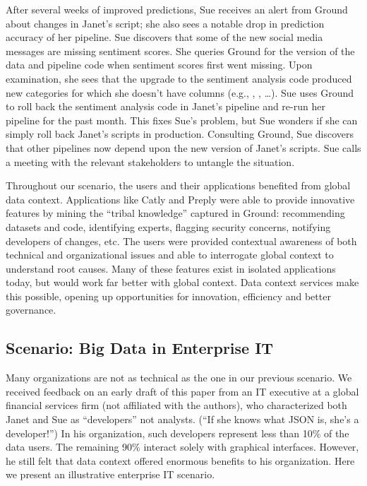 \documentclass{sig-alternate}
\begin{document}
After several weeks of improved predictions, Sue receives an alert from Ground about changes in Janet's script; she also sees a notable drop in prediction accuracy of her pipeline. 
Sue discovers that some of the new social media messages are missing sentiment scores.
She queries Ground for the version of the data and pipeline code when sentiment scores first went missing.
Upon examination, she sees that the upgrade to the sentiment analysis code produced new categories for which she doesn't have columns (e.g., , , \ldots).
Sue uses Ground to roll back the sentiment analysis code in Janet's pipeline and re-run her pipeline for the past month.  
This fixes Sue's problem, but Sue wonders if she can simply roll back Janet's scripts in production. 
Consulting Ground, Sue discovers that other pipelines now depend upon the new version of Janet's scripts.
Sue calls a meeting with the relevant stakeholders to untangle the situation.

Throughout our scenario, the users and their applications benefited from global data context. 
Applications like Catly and Preply were able to provide innovative features by mining the ``tribal knowledge'' captured in Ground:
recommending datasets and code, identifying experts, flagging security concerns, notifying developers of changes, etc.
The users were provided contextual awareness of both technical and organizational issues and able to interrogate global context to understand root causes. 
Many of these features exist in isolated applications today, but would work far better with global context. 
Data context services make this possible, opening up opportunities for innovation, efficiency and better governance.

\subsection{Scenario: Big Data in Enterprise IT}
Many organizations are not as technical as the one in our previous scenario. We received feedback on an early draft of this paper from an IT executive at a global financial services firm (not affiliated with the authors), who characterized both Janet and Sue as ``developers'' not analysts. (``If she knows what JSON is, she's a developer!'') In his organization, such developers represent less than 10\% of the data users. The remaining 90\% interact solely with graphical interfaces. However, he still felt that data context offered enormous benefits to his organization. Here we present an illustrative enterprise IT scenario.
\end{document}

